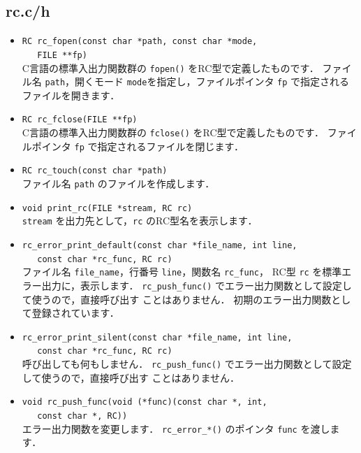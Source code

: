 \subsection{rc.c/h}
\begin{itemize}
\item \verb|RC rc_fopen(const char *path, const char *mode, | \\
	\verb|   FILE **fp)| \ \\
C言語の標準入出力関数群の \verb|fopen()| をRC型で定義したものです．
ファイル名 \verb|path|，開くモード \verb|mode|を指定し，ファイルポインタ 
\verb|fp| で指定されるファイルを開きます．

\item \verb|RC rc_fclose(FILE **fp)| \ \\
C言語の標準入出力関数群の \verb|fclose()| をRC型で定義したものです．
ファイルポインタ \verb|fp| で指定されるファイルを閉じます．

\item \verb|RC rc_touch(const char *path)| \ \\
ファイル名 \verb|path| のファイルを作成します．

\item \verb|void print_rc(FILE *stream, RC rc)| \ \\
\verb|stream| を出力先として，\verb|rc| のRC型名を表示します．

\item \verb|rc_error_print_default(const char *file_name, int line, | \\
	\verb|   const char *rc_func, RC rc)| \ \\
ファイル名 \verb|file_name|，行番号 \verb|line|，関数名 \verb|rc_func|，
RC型 \verb|rc| を標準エラー出力に，表示します．
\verb|rc_push_func()| でエラー出力関数として設定して使うので，直接呼び出す
ことはありません．
初期のエラー出力関数として登録されています．

\item \verb|rc_error_print_silent(const char *file_name, int line, | \\
	\verb|   const char *rc_func, RC rc)| \ \\
呼び出しても何もしません．
\verb|rc_push_func()| でエラー出力関数として設定して使うので，直接呼び出す
ことはありません．

\item \verb|void rc_push_func(void (*func)(const char *, int, | \\
	\verb|   const char *, RC))| \ \\
エラー出力関数を変更します．
\verb|rc_error_*()| のポインタ \verb|func| を渡します．


\end{itemize}
